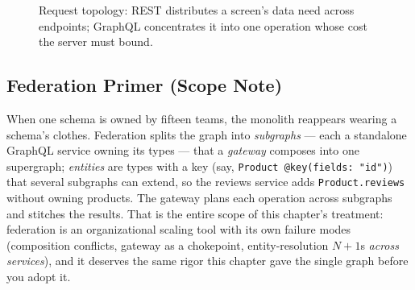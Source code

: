 \begin{figure}[h]
  \centering
  \caption{Request topology: REST distributes a screen's data need across
           endpoints; GraphQL concentrates it into one operation whose
           cost the server must bound.}
  \label{fig:ch12-topology}
\end{figure}

\subsection{Federation Primer (Scope Note)}
\label{sec:ch12-federation}

When one schema is owned by fifteen teams, the monolith reappears wearing
a schema's clothes. Federation splits the graph into \emph{subgraphs} ---
each a standalone GraphQL service owning its types --- that a
\emph{gateway} composes into one supergraph; \emph{entities} are types
with a key (say, \texttt{Product @key(fields: "id")}) that several
subgraphs can extend, so the reviews service adds
\texttt{Product.reviews} without owning products. The gateway plans each
operation across subgraphs and stitches the results. That is the entire
scope of this chapter's treatment: federation is an organizational
scaling tool with its own failure modes (composition conflicts, gateway as
a chokepoint, entity-resolution $N{+}1$s \emph{across services}), and it
deserves the same rigor this chapter gave the single graph before you
adopt it.

